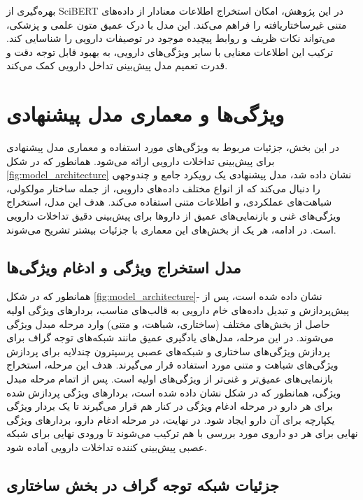 بهره‌گیری از SciBERT در این پژوهش، امکان استخراج اطلاعات معنادار از داده‌های متنی غیرساختاریافته را فراهم می‌کند. این مدل با درک عمیق متون علمی و پزشکی، می‌تواند نکات ظریف و روابط پیچیده موجود در توصیفات دارویی را شناسایی کند. ترکیب این اطلاعات معنایی با سایر ویژگی‌های دارویی، به بهبود قابل توجه دقت و قدرت تعمیم مدل پیش‌بینی تداخل دارویی کمک می‌کند.

\section{ویژگی‌ها و معماری مدل پیشنهادی}

در این بخش، جزئیات مربوط به ویژگی‌های مورد استفاده و معماری مدل پیشنهادی برای پیش‌بینی تداخلات دارویی ارائه می‌شود. همانطور که در شکل \ref{fig:model_architecture} نشان داده شد، مدل پیشنهادی یک رویکرد جامع و چندوجهی را دنبال می‌کند که از انواع مختلف داده‌های دارویی، از جمله ساختار مولکولی، شباهت‌های عملکردی، و اطلاعات متنی استفاده می‌کند. هدف این مدل، استخراج ویژگی‌های غنی و بازنمایی‌های عمیق از داروها برای پیش‌بینی دقیق تداخلات دارویی است. در ادامه، هر یک از بخش‌های این معماری با جزئیات بیشتر تشریح می‌شوند.

\subsection{مدل استخراج ویژگی و ادغام ویژگی‌ها}

همانطور که در شکل \ref{fig:model_architecture}- نشان داده شده است، پس از پیش‌پردازش و تبدیل داده‌های خام دارویی به قالب‌های مناسب، بردارهای ویژگی اولیه حاصل از بخش‌های مختلف (ساختاری، شباهت، و متنی) وارد مرحله مبدل ویژگی می‌شوند. در این مرحله، مدل‌های یادگیری عمیق مانند شبکه‌های توجه گراف برای پردازش ویژگی‌های ساختاری و شبکه‌های عصبی پرسپترون چندلایه برای پردازش ویژگی‌های شباهت و متنی مورد استفاده قرار می‌گیرند. هدف این مرحله، استخراج بازنمایی‌های عمیق‌تر و غنی‌تر از ویژگی‌های اولیه است. پس از اتمام مرحله مبدل ویژگی، همانطور که در شکل نشان داده شده است، بردارهای ویژگی پردازش شده برای هر دارو در مرحله ادغام ویژگی در کنار هم قرار می‌گیرند تا یک بردار ویژگی یکپارچه برای آن دارو ایجاد شود. در نهایت، در مرحله ادغام دارو، بردارهای ویژگی نهایی برای هر دو داروی مورد بررسی با هم ترکیب می‌شوند تا ورودی نهایی برای شبکه عصبی پیش‌بینی کننده تداخلات دارویی آماده شود.

\subsection{جزئیات شبکه توجه گراف در بخش ساختاری}


